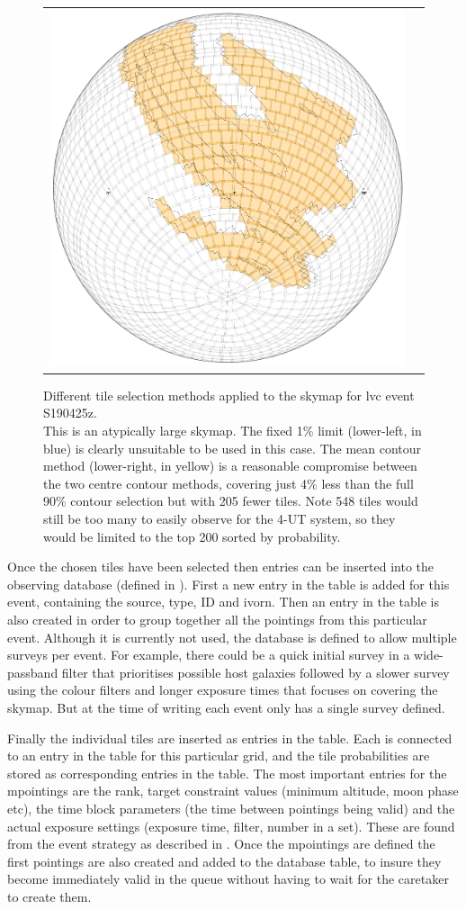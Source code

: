 \begin{colsection}
\begin{colsection}
\begin{figure}[p]
\begin{center}
\begin{tabular}{cc}
\includegraphics[width=0.25\linewidth]{images/tiling/3_b.png}
\\

\end{tabular}
\end{center}
\caption[Different tile selection methods for S190425z]{Different tile selection methods applied to the skymap for \gls{lvc} event S190425z.\\
This is an atypically large skymap. The fixed 1\% limit (lower-left, in blue) is clearly unsuitable to be used in this case. The mean contour method (lower-right, in yellow) is a reasonable compromise between the two centre contour methods, covering just 4\% less than the full 90\% contour selection but with 205 fewer tiles. Note 548 tiles would still be too many to easily observe for the 4-UT system, so they would be limited to the top 200 sorted by probability.
}
\label{fig:tiling_S190425z}
\end{figure}


\clearpage

Once the chosen tiles have been selected then entries can be inserted into the observing database (defined in ). First a new entry in the  table is added for this event, containing the source, type, ID and \gls{ivorn}. Then an entry in the  table is also created in order to group together all the pointings from this particular event. Although it is currently not used, the database is defined to allow multiple surveys per event. For example, there could be a quick initial survey in a wide-passband filter that prioritises possible host galaxies followed by a slower survey using the colour filters and longer exposure times that focuses on covering the skymap. But at the time of writing each event only has a single survey defined.

Finally the individual tiles are inserted as entries in the  table. Each is connected to an entry in the  table for this particular grid, and the tile probabilities are stored as corresponding entries in the  table. The most important entries for the mpointings are the rank, target constraint values (minimum altitude, moon phase etc), the time block parameters (the time between pointings being valid) and the actual exposure settings (exposure time, filter, number in a set). These are found from the event strategy as described in . Once the mpointings are defined the first pointings are also created and added to the database  table, to insure they become immediately valid in the queue without having to wait for the caretaker to create them.


\end{colsection}
\end{colsection}
